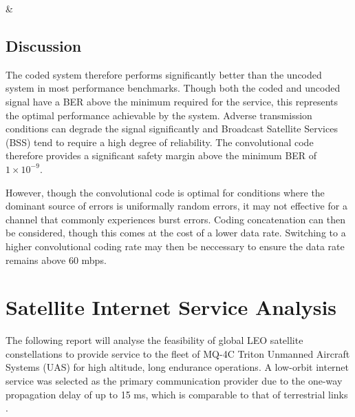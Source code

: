 \documentclass[12pt]{article}
\begin{document}
{\Name & \Value }

\subsection{Discussion}

The coded system therefore performs significantly better than the uncoded system in most performance benchmarks. Though both the coded and uncoded signal have a BER above the minimum required for the service, this represents the optimal performance achievable by the system. Adverse transmission conditions can degrade the signal significantly and Broadcast Satellite Services (BSS) tend to require a high degree of reliability. The convolutional code therefore provides a significant safety margin above the minimum BER of \(1 \times 10^{-9}\). 

However, though the convolutional code is optimal for conditions where the dominant source of errors is uniformally random errors, it may not effective for a channel that commonly experiences burst errors. Coding concatenation can then be considered, though this comes at the cost of a lower data rate. Switching to a higher convolutional coding rate may then be neccessary to ensure the data rate remains above 60 mbps.


\newpage
\raggedright
\section{Satellite Internet Service Analysis}
The following report will analyse the feasibility of global LEO satellite constellations to provide service to the fleet of MQ-4C Triton Unmanned Aircraft Systems (UAS) for high altitude, long endurance operations. A low-orbit internet service was selected as the primary communication provider due to the one-way propagation delay of up to 15 ms, which is comparable  to that of terrestrial links \cite{guolong}.  
\end{document}
